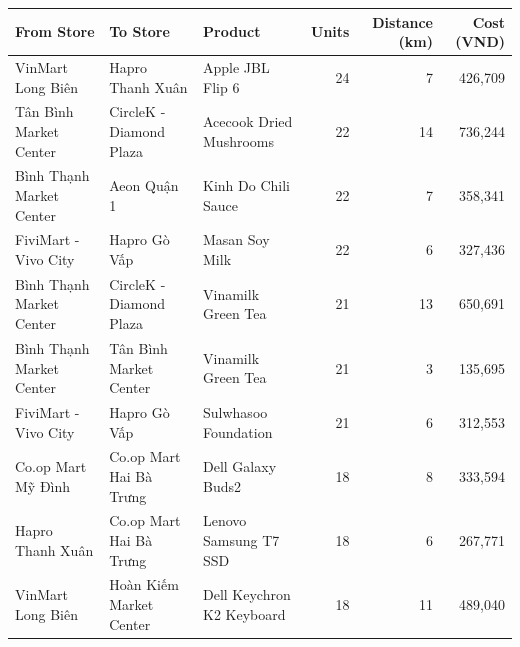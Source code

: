 \begin{tabular}{lllrrr}
\toprule
From Store & To Store & Product & Units & Distance (km) & Cost (VND) \\
\midrule
VinMart Long Biên & Hapro Thanh Xuân & Apple JBL Flip 6 & 24 & 7 & 426,709 \\
Tân Bình Market Center & CircleK - Diamond Plaza & Acecook Dried Mushrooms & 22 & 14 & 736,244 \\
Bình Thạnh Market Center & Aeon Quận 1 & Kinh Do Chili Sauce & 22 & 7 & 358,341 \\
FiviMart - Vivo City & Hapro Gò Vấp & Masan Soy Milk & 22 & 6 & 327,436 \\
Bình Thạnh Market Center & CircleK - Diamond Plaza & Vinamilk Green Tea & 21 & 13 & 650,691 \\
Bình Thạnh Market Center & Tân Bình Market Center & Vinamilk Green Tea & 21 & 3 & 135,695 \\
FiviMart - Vivo City & Hapro Gò Vấp & Sulwhasoo Foundation & 21 & 6 & 312,553 \\
Co.op Mart Mỹ Đình & Co.op Mart Hai Bà Trưng & Dell Galaxy Buds2 & 18 & 8 & 333,594 \\
Hapro Thanh Xuân & Co.op Mart Hai Bà Trưng & Lenovo Samsung T7 SSD & 18 & 6 & 267,771 \\
VinMart Long Biên & Hoàn Kiếm Market Center & Dell Keychron K2 Keyboard & 18 & 11 & 489,040 \\
\bottomrule
\end{tabular}
